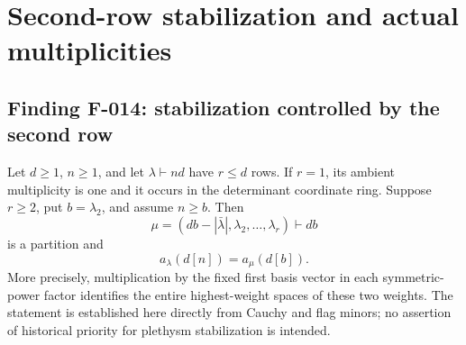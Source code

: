 \section{Second-row stabilization and actual multiplicities}

\subsection*{Finding F-014: stabilization controlled by the second row}
Let \(d\geq1\), \(n\geq1\), and let \(\lambda\vdash nd\)
have \(r\leq d\) rows. If \(r=1\), its ambient multiplicity is
one and it occurs in the determinant coordinate ring. Suppose
\(r\geq2\), put \(b=\lambda_2\), and assume \(n\geq b\).
Then
\[
       \mu=(db-|\bar\lambda|,\lambda_2,\ldots,\lambda_r)
                                                     \vdash db
\]
is a partition and
\begin{equation}\label{eq:F014stab}
                         a_\lambda(d[n])=a_\mu(d[b]).
\end{equation}
More precisely, multiplication by the fixed first basis vector
in each symmetric-power factor identifies the entire highest-weight
spaces of these two weights. The statement is established here
directly from Cauchy and flag minors; no assertion of historical
priority for plethysm stabilization is intended.

